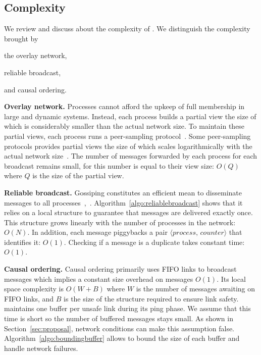 \subsection{Complexity}
\label{subsec:complexity}

We review and discuss about the complexity of \CBROADCAST. We distinguish the
complexity brought by 
\begin{inparaenum}[(i)]
\item the overlay network,
\item reliable broadcast,
\item and causal ordering.
\end{inparaenum}

\noindent \textbf{Overlay network.} Processes cannot afford the upkeep of full
membership in large and dynamic systems. Instead, each process builds a partial
view the size of which is considerably smaller than the actual network size.  To
maintain these partial views, each process runs a peer-sampling
protocol~\cite{bertier-d2ht,jelasity2007gossip,jelasity2009tman}.  Some
peer-sampling protocols provides partial views the size of which scales
logarithmically with the actual network size~\cite{nedelec2017adaptive}.  The
number of messages forwarded by each process for each broadcast remains small,
for this number is equal to their view size: $O(Q)$ where $Q$ is the size of the
partial view.


\noindent \textbf{Reliable broadcast.} Gossiping constitutes an efficient mean
to disseminate messages to all
processes~\cite{demers1987epidemic},~\cite{birman1999bimodal}.
Algorithm~\ref{algo:reliablebroadcast} shows that it relies on a local structure
to guarantee that messages are delivered exactly once. This structure grows
linearly with the number of processes in the network: $O(N)$. In addition, each
message piggybacks a pair $\langle process,\, counter \rangle$ that identifies
it: $O(1)$. Checking if a message is a duplicate takes constant time: $O(1)$.

\noindent \textbf{Causal ordering.} Causal ordering primarily uses FIFO links to
broadcast messages which implies a constant size overhead on messages
$O(1)$. Its local space complexity is $O(W + B)$ where $W$ is the number of
messages awaiting on FIFO links, and $B$ is the size of the structure required
to ensure link safety. \CBROADCAST maintains one buffer per unsafe link during
its ping phase.  We assume that this time is short so the number of buffered
messages stays small. As shown in Section~\ref{sec:proposal}, network conditions
can make this assumption false. Algorithm~\ref{algo:boundingbuffer} allows to
bound the size of each buffer and handle network failures.

